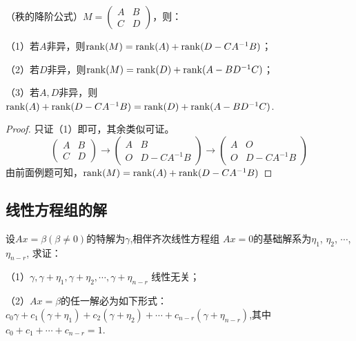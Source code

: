 \begin{example}
  （秩的降阶公式）\( M=\begin{pmatrix}
    A & B\\
    C & D\end{pmatrix}\)，则：

  （1）若\(A\)非异，则\(\operatorname{rank}(M)=\operatorname{rank}(A)+\operatorname{rank}(D-CA^{-1}B)\)；

  （2）若\(D\)非异，则\(\operatorname{rank}(M)=\operatorname{rank}(D)+\operatorname{rank}(A-BD^{-1}C)\)；

  （3）若\(A,D\)非异，则\(\operatorname{rank}(A)+\operatorname{rank}(D-CA^{-1}B)=\operatorname{rank}(D)+\operatorname{rank}(A-BD^{-1}C)\).
\end{example}

\begin{proof}
  只证（1）即可，其余类似可证。
  \[\begin{pmatrix}
      A & B\\
      C & D\end{pmatrix}\longrightarrow \begin{pmatrix}
      A & B\\
      O & D-CA^{-1}B\end{pmatrix}\longrightarrow \begin{pmatrix}
      A & O\\
      O & D-CA^{-1}B\end{pmatrix}\]
  由前面例题可知，\(\operatorname{rank}(M)=\operatorname{rank}(A)+\operatorname{rank}(D-CA^{-1}B)\)
\end{proof}

\subsection{线性方程组的解}
\begin{example}
  设\(Ax=\beta(\beta\neq 0)\)的特解为\(\gamma\),相伴齐次线性方程组
  \(Ax=0\)的基础解系为$\eta_1$, $\eta_2$, $\cdots$, $\eta_{n-r}$, 求证：

  （1）\(\gamma,\gamma+\eta_1,\gamma+\eta_2,\cdots,\gamma+\eta_{n-r}\)
  线性无关；

  （2）\(Ax=\beta\)的任一解必为如下形式：
  \(c_0\gamma+c_1(\gamma+\eta_1)+c_2(\gamma+\eta_2)+
  \cdots+c_{n-r}(\gamma+\eta_{n-r})\),其中\(c_0+c_1+\cdots+c_{n-r}=1\).
\end{example}

